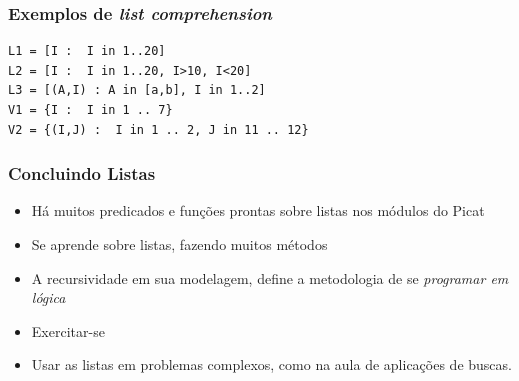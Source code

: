\begin{frame}[fragile, allowframebreaks=0.9]

\frametitle{Exemplos de \textit{list comprehension}}


\begin{verbatim}
L1 = [I :  I in 1..20]
L2 = [I :  I in 1..20, I>10, I<20]
L3 = [(A,I) : A in [a,b], I in 1..2]
V1 = {I :  I in 1 .. 7}
V2 = {(I,J) :  I in 1 .. 2, J in 11 .. 12}
\end{verbatim}

\end{frame}


\begin{frame}[fragile]
\frametitle{Concluindo Listas}

\begin{block}{}
\begin{itemize}
  \item Há muitos predicados e funções prontas sobre listas nos módulos do Picat
  \item Se aprende sobre listas, fazendo muitos métodos
  \item A recursividade em sua modelagem, define a metodologia de se \textit{programar em lógica}
  \item Exercitar-se
  \item Usar as listas em problemas complexos, como na aula de aplicações de buscas.
  
\end{itemize}

\end{block}

\end{frame}





